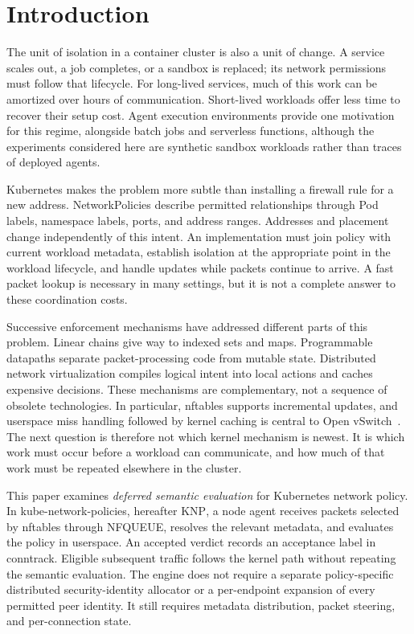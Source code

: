 \documentclass[letterpaper,twocolumn,10pt]{article}
\newcommand{\sys}{\textsc{KNP}}
\begin{document}
\section{Introduction}
The unit of isolation in a container cluster is also a unit of change.
A service scales out, a job completes, or a sandbox is replaced; its network
permissions must follow that lifecycle. For long-lived services, much of this
work can be amortized over hours of communication. Short-lived workloads
offer less time to recover their setup cost. Agent execution environments
provide one motivation for this regime, alongside batch jobs and serverless
functions, although the experiments considered here are synthetic sandbox
workloads rather than traces of deployed agents.

Kubernetes makes the problem more subtle than installing a firewall rule
for a new address. NetworkPolicies describe permitted relationships through
Pod labels, namespace labels, ports, and address ranges. Addresses and
placement change independently of this intent. An implementation must join
policy with current workload metadata, establish isolation at the appropriate
point in the workload lifecycle, and handle updates while packets continue
to arrive. A fast packet lookup is necessary in many settings, but it is
not a complete answer to these coordination costs.

Successive enforcement mechanisms have addressed different parts of this
problem. Linear chains give way to indexed sets and maps. Programmable
datapaths separate packet-processing code from mutable state. Distributed
network virtualization compiles logical intent into local actions and
caches expensive decisions. These mechanisms are complementary, not a
sequence of obsolete technologies. In particular, nftables supports
incremental updates, and userspace miss handling followed by kernel caching
is central to Open vSwitch~\cite{winship2025nftables,pfaff2015ovs}. The next
question is therefore not which kernel mechanism is newest. It is which
work must occur before a workload can communicate, and how much of that
work must be repeated elsewhere in the cluster.

This paper examines \emph{deferred semantic evaluation} for Kubernetes
network policy. In kube-network-policies, hereafter \sys{}, a node agent
receives packets selected by nftables through NFQUEUE, resolves the relevant
metadata, and evaluates the policy in userspace. An accepted verdict records
an acceptance label in conntrack. Eligible subsequent traffic follows the
kernel path without repeating the semantic evaluation. The engine does not
require a separate policy-specific distributed security-identity allocator
or a per-endpoint expansion of every permitted peer identity. It still
requires metadata distribution, packet steering, and per-connection state.
\end{document}
